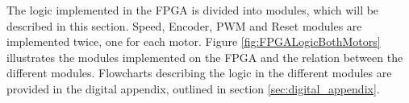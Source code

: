 \documentclass[../../main.tex]{subfiles}
\begin{document}
The logic implemented in the FPGA is divided into modules, which will be described in this section. Speed, Encoder, PWM and Reset modules are implemented twice, one for each motor. Figure \ref{fig:FPGALogicBothMotors} illustrates the modules implemented on the FPGA and the relation between the different modules. Flowcharts describing the logic in the different modules are provided in the digital appendix, outlined in section \ref{sec:digital_appendix}.      
    
    
\end{document}
